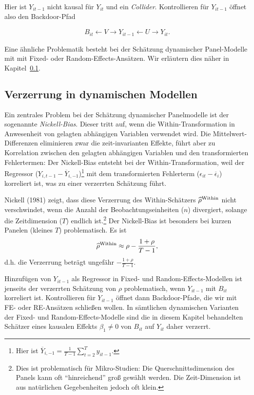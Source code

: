 \documentclass[
  a4paper,
  DIV=11,
  oneside]{scrreprt}
\begin{document}
Hier ist \(Y_{it-1}\) nicht kausal für \(Y_{it}\) und ein
\emph{Collider}. Kontrollieren für \(Y_{it-1}\) öffnet also den
Backdoor-Pfad

\begin{align*}
  B_{it} \leftarrow V \rightarrow Y_{it-1} \leftarrow U \rightarrow Y_{it}.
\end{align*}

Eine ähnliche Problematik besteht bei der Schätzung dynamischer
Panel-Modelle mit mit Fixed- oder Random-Effects-Ansätzen. Wir erläutern
dies näher in Kapitel~\ref{sec-vidp}.

\subsection{Verzerrung in dynamischen Modellen}\label{sec-vidp}

Ein zentrales Problem bei der Schätzung dynamischer Panelmodelle ist der
sogenannte \emph{Nickell-Bias}. Dieser tritt auf, wenn die
Within-Transformation in Anwesenheit von gelagten abhängigen Variablen
verwendet wird. Die Mittelwert-Differenzen eliminieren zwar die
zeit-invarianten Effekte, führt aber zu Korrelation zwischen den
gelagten abhängigen Variablen und den transformierten Fehlertermen: Der
Nickell-Bias entsteht bei der Within-Transformation, weil der Regressor
(\(Y_{i,t-1} - \overline{Y}_{i,-1}\))\footnote{Hier ist
  \(\overline{Y}_{i,-1} = \frac{1}{T-1}\sum_{t=2}^T y_{it-1}\).} mit dem
transformierten Fehlerterm (\(\epsilon_{it} - \overline{\epsilon}_i\))
korreliert ist, was zu einer verzerrten Schätzung führt.

Nickell (1981) zeigt, dass diese Verzerrung des Within-Schätzers
\(\widehat{\rho}^\textup{Within}\) nicht verschwindet, wenn die Anzahl
der Beobachtungseinheiten (\(n\)) divergiert, solange die Zeitdimension
(\(T\)) endlich ist.\footnote{Dies ist problematisch für Mikro-Studien:
  Die Querschnittsdimension des Panels kann oft ``hinreichend'' groß
  gewählt werden. Die Zeit-Dimension ist aus natürlichen Gegebenheiten
  jedoch oft klein.} Der Nickell-Bias ist besonders bei kurzen Panelen
(kleines \(T\)) problematisch. Es ist \begin{align*}
  \widehat{\rho}^\textup{Within} \approx \rho - \frac{1 + \rho}{T-1},
\end{align*} d.h. die Verzerrung beträgt ungefähr
\(-\frac{1+\rho}{T-1}\).

Hinzufügen von \(Y_{it-1}\) als Regressor in Fixed- und
Random-Effects-Modellen ist jenseits der verzerrten Schätzung von
\(\rho\) problematisch, wenn \(Y_{it-1}\) mit \(B_{it}\) korreliert ist.
Kontrollieren für \(Y_{it-1}\) öffnet dann Backdoor-Pfade, die wir mit
FE- oder RE-Ansätzen schließen wollen. In sämtlichen dynamischen
Varianten der Fixed- und Random-Effects-Modelle sind die in diesem
Kapitel behandelten Schätzer eines kausalen Effekts \(\beta_1 \neq 0\)
von \(B_{it}\) auf \(Y_{it}\) daher verzerrt.
\end{document}
